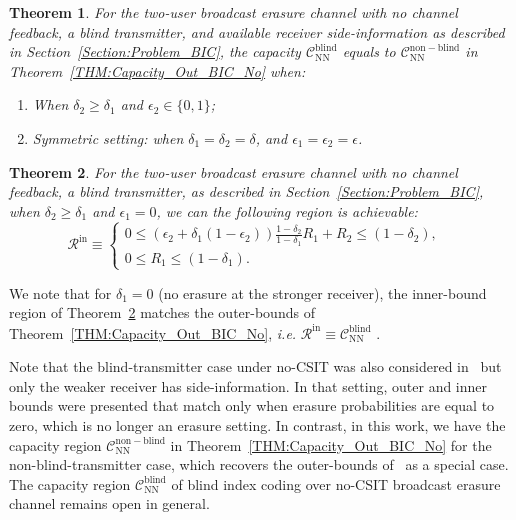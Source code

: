 \documentclass[journal,12pt,draftcls,onecolumn]{IEEEtran}
\newtheorem{theorem}{Theorem}
\begin{document}
\begin{theorem}
\label{THM:Blind}
For the two-user broadcast erasure channel with no channel feedback, a {blind transmitter}, and available receiver side-information as described in Section~\ref{Section:Problem_BIC}, the capacity $\mathcal{C}^\mathrm{blind}_\mathrm{NN}$ equals to $\mathcal{C}^\mathrm{non-blind}_\mathrm{NN}$ in Theorem~\ref{THM:Capacity_Out_BIC_No} when:
\begin{enumerate}

\item When $\delta_2 \geq \delta_1$ and $\epsilon_2 \in \{ 0, 1 \}$;

\item Symmetric setting: when $\delta_1 = \delta_2 = \delta$, and $\epsilon_1 = \epsilon_2 = \epsilon$.

\end{enumerate}
\end{theorem}

\begin{theorem}
\label{THM:Blind-Ach}
For the two-user broadcast erasure channel with no channel feedback, a {blind transmitter}, as described in Section~\ref{Section:Problem_BIC}, when $\delta_2 \geq \delta_1$ and $\epsilon_1 = 0$, we can the following region is achievable:
\begin{equation}
\label{Eq:Capacity_Inner_BIC_No}
\mathcal{R}^\mathrm{in} \equiv
\left\{ \begin{array}{ll}
0 \leq  \left( \epsilon_2+\delta_1(1-\epsilon_2) \right) \frac{1-\delta_2}{1-\delta_1} R_1 + R_2 \leq \left( 1 - \delta_2 \right), & \\
0 \leq  R_1 \leq \left( 1 - \delta_1 \right). &
\end{array} \right.
\end{equation}
\end{theorem}

\noindent
We note that for $\delta_1 = 0$ (no erasure at the stronger receiver), the inner-bound region of Theorem~\ref{THM:Blind-Ach} matches the outer-bounds of Theorem~\ref{THM:Capacity_Out_BIC_No}, \emph{i.e.} $\mathcal{R}^\mathrm{in} \equiv \mathcal{C}^\mathrm{blind}_\mathrm{NN}$ .


Note that the blind-transmitter case under no-CSIT was also considered in~\cite{kao2016blind} but only the weaker receiver has side-information. In that setting, outer and inner bounds were presented that match only when erasure probabilities are equal to zero, which is no longer an erasure setting. In contrast, in this work, we have the capacity region $\mathcal{C}^\mathrm{non-blind}_\mathrm{NN}$ in Theorem~\ref{THM:Capacity_Out_BIC_No} for the non-blind-transmitter case, which recovers the outer-bounds of~\cite{kao2016blind} as a special case. The capacity region $\mathcal{C}^\mathrm{blind}_\mathrm{NN}$ of blind index coding over no-CSIT broadcast erasure channel remains open in general.
\end{document}
